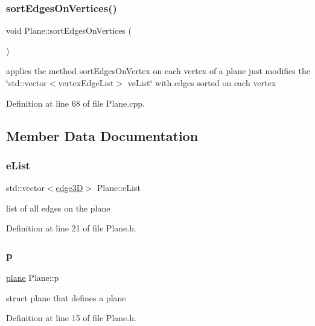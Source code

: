 \subsubsection{\texorpdfstring{sort\+Edges\+On\+Vertices()}{sortEdgesOnVertices()}}
{\footnotesize\ttfamily void Plane\+::sort\+Edges\+On\+Vertices (\begin{DoxyParamCaption}{ }\end{DoxyParamCaption})}

applies the method sort\+Edges\+On\+Vertex on each vertex of a plane just modifies the \char`\"{}std\+::vector$<$vertex\+Edge\+List$>$ ve\+List\char`\"{} with edges sorted on each vertex 

Definition at line 68 of file Plane.\+cpp.



\subsection{Member Data Documentation}
\mbox{\label{class_plane_a71c027d1ed3593af105dcbdee9e1b11f}} 
\subsubsection{\texorpdfstring{e\+List}{eList}}
{\footnotesize\ttfamily std\+::vector$<$\mbox{\hyperlink{structedge3_d}{edge3D}}$>$ Plane\+::e\+List}



list of all edges on the plane 



Definition at line 21 of file Plane.\+h.

\mbox{\label{class_plane_a65c157cab5de9f5c3c1ecd5b7770badc}} 
\subsubsection{\texorpdfstring{p}{p}}
{\footnotesize\ttfamily \mbox{\hyperlink{structplane}{plane}} Plane\+::p}



struct plane that defines a plane 



Definition at line 15 of file Plane.\+h.

\mbox{\label{class_plane_a83494ec7ac0ca05a7fb8e8340c3a99fc}} 
